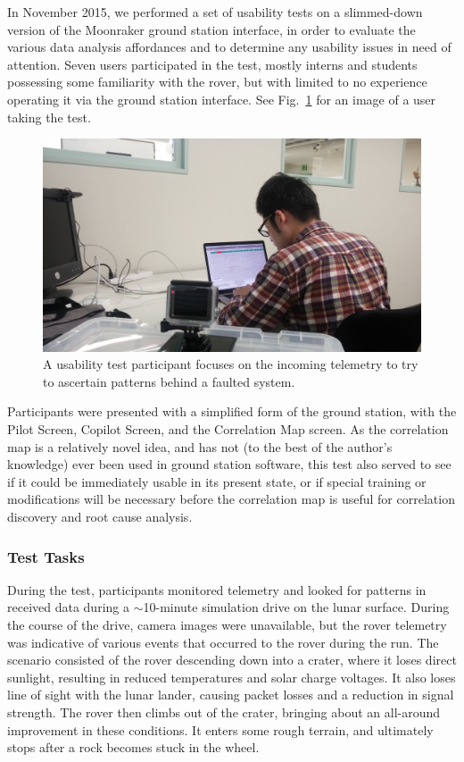 In November 2015, we performed a set of usability tests on a slimmed-down version of the Moonraker ground station interface, in order to evaluate the various data analysis affordances and to determine any usability issues in need of attention. Seven users participated in the test, mostly interns and students possessing some familiarity with the rover, but with limited to no experience operating it via the ground station interface. See Fig.~\ref{fig:ui_test_takako} for an image of a user taking the test.

\begin{figure}[h]
\centering
    \includegraphics[width=\columnwidth]{images/ui_test_takuto.jpg}
    \caption{A usability test participant focuses on the incoming telemetry to try to ascertain patterns behind a faulted system.}
    \label{fig:ui_test_takako}
\end{figure}

Participants were presented with a simplified form of the ground station, with the Pilot Screen, Copilot Screen, and the Correlation Map screen. As the correlation map is a relatively novel idea, and has not (to the best of the author's knowledge) ever been used in ground station software, this test also served to see if it could be immediately usable in its present state, or if special training or modifications will be necessary before the correlation map is useful for correlation discovery and root cause analysis.

\subsubsection{Test Tasks}

During the test, participants monitored telemetry and looked for patterns in received data during a $\sim$10-minute simulation drive on the lunar surface. During the course of the drive, camera images were unavailable, but the rover telemetry was indicative of various events that occurred to the rover during the run. The scenario consisted of the rover descending down into a crater, where it loses direct sunlight, resulting in reduced temperatures and solar charge voltages. It also loses line of sight with the lunar lander, causing packet losses and a reduction in signal strength. The rover then climbs out of the crater, bringing about an all-around improvement in these conditions. It enters some rough terrain, and ultimately stops after a rock becomes stuck in the wheel.


